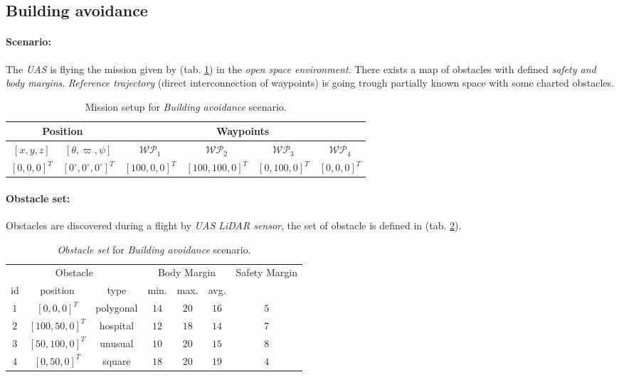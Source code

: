\subsection{Building avoidance}\label{s:testBuildingAvoidance}

\noindent \paragraph{Scenario:} The \emph{UAS}  is flying the mission given by (tab. \ref{tab:missionSetupForBuildingAvoidanceScenario}) in the \emph{open space environment}. There exists a map of obstacles with defined \emph{safety and body margins}. \emph{Reference trajectory} (direct interconnection of waypoints) is going trough partially known space with some charted obstacles. 

\begin{table}[H]
	\centering
	\begin{tabular}{c|c||c|c|c|c}
		\multicolumn{2}{c||}{Position} & \multicolumn{4}{c}{Waypoints} \\\hline
		$[x,y,z]$     & $[\theta,\varpi,\psi]$           & $\mathscr{WP}_1$   & $\mathscr{WP}_2$   & $\mathscr{WP}_3$   & $\mathscr{WP}_4$    \\\hline\hline
		$[0,0,0]^T $       & $[0^\circ,0^\circ,0^\circ]^T$ & $[100,0,0]^T$       & $[100,100,0]^T$       & $[0,100,0]^T$       & $[0,0,0]^T$      
	\end{tabular}
	\caption{Mission setup for \emph{Building avoidance} scenario.}
	\label{tab:missionSetupForBuildingAvoidanceScenario}
\end{table}

\noindent \paragraph{Obstacle set:} Obstacles are discovered during a flight by \emph{UAS LiDAR sensor}, the set of obstacle is defined in (tab. \ref{tab:obstacleSetBuildingAvoidance}). 

\begin{table}[H]
	\centering
	\begin{tabular}{c|c|c|c|c|c|c}
		\multicolumn{3}{c|}{Obstacle} & \multicolumn{3}{c|}{Body Margin} & \multirow{2}{*}{Safety Margin}\\\cline{1-6}
		id & position & type & min. & max. & avg. &   \\\hline\hline
		$1$ & $[0,0,0]^T$ & polygonal & $14$ & $20$ & $16$ & $5$ \\\hline
		$2$ & $[100,50,0]^T$ & hospital & $12$ & $18$ & $14$ & $7$ \\\hline 
		$3$ & $[50,100,0]^T$ & unusual  & $10$ & $20$ & $15$ & $8$ \\\hline
		$4$ & $[0,50,0]^T$ & square & $18$ & $20$ & $19$ & $4$ \\
	 \end{tabular}
	\caption{\emph{Obstacle set} for \emph{Building avoidance} scenario.}
	\label{tab:obstacleSetBuildingAvoidance}
\end{table}

